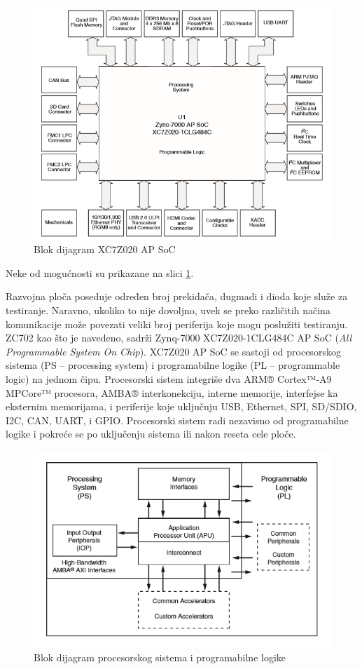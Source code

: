 \documentclass[a4paper, 12pt, diplomski]{etf}
\begin{document}
		\begin{figure}[htb]
			\centering
			\includegraphics[width=.6\textwidth]{images/zynq7000APSoC.png}
			\caption{Blok dijagram XC7Z020 AP SoC}
			\label{fig:zynq}
		\end{figure}

	Neke od mogućnosti su prikazane na slici \ref{fig:zynq}.

	Razvojna ploča poseduje određen broj prekidača, dugmadi i dioda koje služe za testiranje. Naravno, ukoliko to nije dovoljno, uvek se preko različitih načina komunikacije može povezati veliki broj periferija koje mogu poslužiti testiranju.
ZC702 kao što je navedeno, sadrži Zynq-7000 XC7Z020-1CLG484C AP SoC (\textit{All Programmable System On Chip}). XC7Z020 AP SoC se sastoji od procesorskog sistema (PS – processing system) i programabilne logike (PL – programmable logic) na jednom čipu. Procesorski sistem integriše dva ARM® Cortex™-A9 MPCore™ procesora, AMBA® interkonekciju, interne memorije, interfejse ka eksternim memorijama, i periferije koje uključuju USB, Ethernet, SPI, SD/SDIO, I2C, CAN, UART, i GPIO.\cite{lit2} Procesorski sistem radi nezavisno od programabilne logike i pokreće se po uključenju sistema ili nakon reseta cele ploče.

		\begin{figure}[htb]
			\centering
			\includegraphics[width=.7\textwidth]{images/PSZYNQ7000.png}
			\caption{Blok dijagram procesorskog sistema i programabilne logike}
			\label{fig:procSysProgLog}
		\end{figure}
\end{document}

